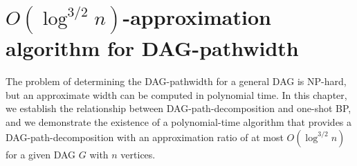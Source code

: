 \documentclass[runningheads]{llncs}
\theoremstyle{plain}
\theoremstyle{definition}
\begin{document}
\begin{comment}
\begin{theorem}\label{alg_lob}
    DAG $G$に対し，幅が$w$である$G$のnice DAGパス分解が与えられたとき，$G$のMaxLOBを$O(2^wwn)$で解くアルゴリズムが存在する．
\end{theorem}

さらに\emph{Disjoint Path problem}に対するパラメータ化アルゴリズムも設計する．この問題は以下の通りである．有向グラフ$G=(V, E)$, $k$個の頂点対$(s_1, t_1),\ (s_2, t_2), \dots ,\ (s_k, t_k)$が入力されたとき，各$s_i$から$t_i$までの点素なパスの組を$\mathcal{P}=(P_1, P_2, \dots , P_k)$とする．各パス$P_i$の長さを$P_i$上の頂点数$|P_i|$としたとき，Disjoint Path Problemはパスの合計長$\sum_{i=1}^k |P_i|$の最小値を求める問題である．

\begin{theorem}
    DAG $G$に対し，幅が$w$である$G$のnice DAGパス分解が与えられたとき，$G$のDisjoint Path Problemを$O((k+1)^w(w^2+wk)n+n^2)$で解くアルゴリズムが存在する．
\end{theorem}

最後に\emph{Directed Steiner problem~(DST problem)}に対するFPTアルゴリズムも設計する．DST probemは，枝重み付き有向グラフ$G=(V, E)$，根$r \in V$，ターミナルと呼ばれる頂点集合$R=\{t_1, t_2, \dots, t_k\} \subseteq V$が与えられたとき，$r$を根とし，各$t_i\in R$を全て含む有向木のうち枝の総重みが最小のものを求める問題である．

\begin{theorem}
    DAG $G$に対し，ターミナルのサイズ$k=|R|$，幅が$w$である$G$のnice DAGパス分解が与えられたとき，$G$のDST problemを$O(2^w(k+w)n + n^2)$で解くFPTアルゴリズムが存在する．
\end{theorem}
\end{comment}








\section{$O(\log^{3/2} n)$-approximation algorithm for DAG-pathwidth}

The problem of determining the DAG-pathwidth for a general DAG is NP-hard, but an approximate width can be computed in polynomial time. In this chapter, we establish the relationship between DAG-path-decomposition and one-shot BP, and we demonstrate the existence of a polynomial-time algorithm that provides a DAG-path-decomposition with an approximation ratio of at most $O(\log ^{3/2} n)$ for a given DAG $G$ with $n$ vertices.
\end{document}
